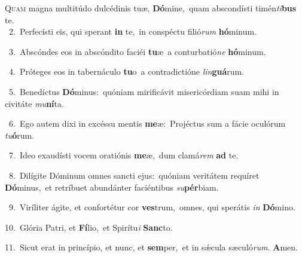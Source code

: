 \lettrine{\initial\textcolor{\initialcolor}{Q}}{uam} magna multitúdo dulcédinis tuæ, \textbf{Dó}\-mine,~\star quam abscondísti timén\-\textit{ti}\-\textbf{bus} te.\\
{\numbfont\textcolor{\numbcolor}{~2.}}~Perfecísti eis, qui sperant \textbf{in} te,~\star in conspéctu filió\textit{rum} \textbf{hó}\-minum.\par
{\numbfont\textcolor{\numbcolor}{~3.}}~Abscóndes eos in abscóndito faciéi \textbf{tu}\-æ~\star a conturbatió\textit{ne} \textbf{hó}\-minum.\par
{\numbfont\textcolor{\numbcolor}{~4.}}~Próteges eos in tabernáculo \textbf{tu}\-o~\star a contradictióne \textit{lin}\-\textbf{guá}rum.\par
{\numbfont\textcolor{\numbcolor}{~5.}}~Benedíctus \textbf{Dó}\-minus:~\star quóniam mirificávit misericórdiam suam mihi in civitáte \textit{mu}\-\textbf{ní}ta.\par
{\numbfont\textcolor{\numbcolor}{~6.}}~Ego autem dixi in excéssu mentis \textbf{me}\-æ:~\star Projéctus sum a fácie oculórum \textit{tu}\-\textbf{ó}rum.\par
{\numbfont\textcolor{\numbcolor}{~7.}}~Ideo exaudísti vocem oratiónis \textbf{me}\-æ,~\star dum clamá\textit{rem} \textbf{ad} te.\par
{\numbfont\textcolor{\numbcolor}{~8.}}~Dilígite Dóminum omnes sancti ejus:~\dagger quóniam veritátem requíret \textbf{Dó}\-minus,~\star et retríbuet abundánter faciéntibus \textit{su}\-\textbf{pér}biam.\par
{\numbfont\textcolor{\numbcolor}{~9.}}~Viríliter ágite, et confortétur cor \textbf{ves}\-trum,~\star omnes, qui sperátis \textit{in} \textbf{Dó}\-mino.\par
{\numbfont\textcolor{\numbcolor}{10.}}~Glória Patri, et \textbf{Fí}\-lio,~\star et Spirítu\textit{i} \textbf{Sanc}\-to.\par
{\numbfont\textcolor{\numbcolor}{11.}}~Sicut erat in princípio, et nunc, et \textbf{sem}\-per,~\star et in sǽcula sæculó\-\textit{rum}\-. \textbf{A}\-men.\par
